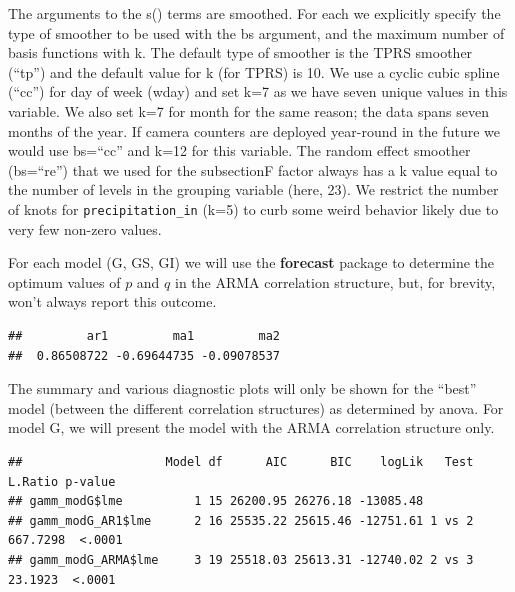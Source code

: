 \documentclass[
]{book}
\newenvironment{Shaded}{\begin{snugshade}}{\end{snugshade}}
\newcommand{\AttributeTok}[1]{\textcolor[rgb]{0.77,0.63,0.00}{#1}}
\newcommand{\DocumentationTok}[1]{\textcolor[rgb]{0.56,0.35,0.01}{\textbf{\textit{#1}}}}
\newcommand{\FunctionTok}[1]{\textcolor[rgb]{0.00,0.00,0.00}{#1}}
\newcommand{\NormalTok}[1]{#1}
\newcommand{\OtherTok}[1]{\textcolor[rgb]{0.56,0.35,0.01}{#1}}
\newcommand{\SpecialCharTok}[1]{\textcolor[rgb]{0.00,0.00,0.00}{#1}}
\newcommand{\StringTok}[1]{\textcolor[rgb]{0.31,0.60,0.02}{#1}}
\begin{document}
The arguments to the s() terms are smoothed. For each we explicitly specify the type of smoother to be used with the bs argument, and the maximum number of basis functions with k. The default type of smoother is the TPRS smoother (``tp'') and the default value for k (for TPRS) is 10. We use a cyclic cubic spline (``cc'') for day of week (wday) and set k=7 as we have seven unique values in this variable. We also set k=7 for month for the same reason; the data spans seven months of the year. If camera counters are deployed year-round in the future we would use bs=``cc'' and k=12 for this variable. The random effect smoother (bs=``re'') that we used for the subsectionF factor always has a k value equal to the number of levels in the grouping variable (here, 23). We restrict the number of knots for \texttt{precipitation\_in} (k=5) to curb some weird behavior likely due to very few non-zero values.

For each model (G, GS, GI) we will use the \textbf{forecast} package to determine the optimum values of \(p\) and \(q\) in the ARMA correlation structure, but, for brevity, won't always report this outcome.

\begin{Shaded}
\end{Shaded}

\begin{verbatim}
##         ar1         ma1         ma2 
##  0.86508722 -0.69644735 -0.09078537
\end{verbatim}

The summary and various diagnostic plots will only be shown for the ``best'' model (between the different correlation structures) as determined by anova. For model G, we will present the model with the ARMA correlation structure only.

\begin{verbatim}
##                    Model df      AIC      BIC    logLik   Test  L.Ratio p-value
## gamm_modG$lme          1 15 26200.95 26276.18 -13085.48                        
## gamm_modG_AR1$lme      2 16 25535.22 25615.46 -12751.61 1 vs 2 667.7298  <.0001
## gamm_modG_ARMA$lme     3 19 25518.03 25613.31 -12740.02 2 vs 3  23.1923  <.0001
\end{verbatim}
\end{document}
